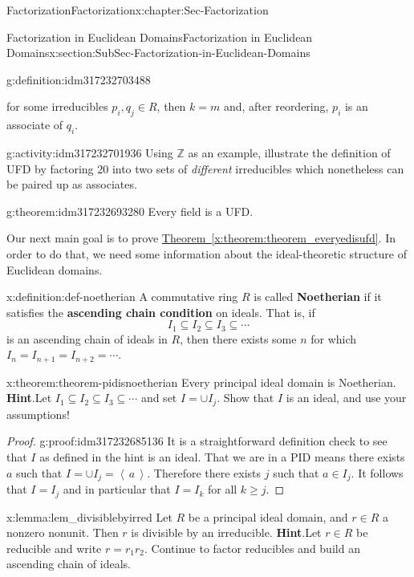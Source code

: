 \documentclass[oneside,10pt,]{book}
\newcommand{\blocktitlefont}{\relax}
\newcommand{\xreffont}{\relax}
\newcommand{\terminology}[1]{\textbf{#1}}
\numberwithin{equation}{section}
\renewcommand{\geq}{\geqslant}
\newcommand{\ideal}[1]{\left\langle\, #1 \,\right\rangle}
\def\Z{{\mathbb Z}}
\begin{document}
\begin{chapterptx}{Factorization}{}{Factorization}{}{}{x:chapter:Sec-Factorization}
\begin{sectionptx}{Factorization in Euclidean Domains}{}{Factorization in Euclidean Domains}{}{}{x:section:SubSec-Factorization-in-Euclidean-Domains}
\begin{definition}{}{g:definition:idm317232703488}
\begin{enumerate}
\begin{equation*}
\end{equation*}
for some irreducibles \(p_i, q_j\in R\), then \(k=m\) and, after reordering, \(p_i\) is an associate of \(q_i\).%
\end{enumerate}
%
\end{definition}
\begin{activity}{}{g:activity:idm317232701936}%
Using \(\Z\) as an example, illustrate the definition of UFD by factoring 20 into two sets of \emph{different} irreducibles which nonetheless can be paired up as associates.%
\end{activity}
\begin{theorem}{}{}{g:theorem:idm317232693280}%
Every field is a UFD.%
\end{theorem}
Our next main goal is to prove \hyperref[x:theorem:theorem_everyedisufd]{Theorem~{\xreffont\ref{x:theorem:theorem_everyedisufd}}}. In order to do that, we need some information about the ideal-theoretic structure of Euclidean domains.%
\begin{definition}{}{x:definition:def-noetherian}%
A commutative ring \(R\) is called \terminology{Noetherian} if it satisfies the \terminology{ascending chain condition} on ideals. That is, if%
\begin{equation*}
I_1 \subseteq I_2\subseteq I_3\subseteq \cdots
\end{equation*}
is an ascending chain of ideals in \(R\), then there exists some \(n\) for which \(I_n = I_{n+1} = I_{n+2} = \cdots\).%
\end{definition}
\begin{theorem}{}{}{x:theorem:theorem-pidisnoetherian}%
Every principal ideal domain is Noetherian.%
\textbf{\blocktitlefont Hint}.\quad{}Let \(I_1\subseteq I_2\subseteq I_3 \subseteq \cdots\) and set \(I = \cup I_j\). Show that \(I\) is an ideal, and use your assumptions!%
\end{theorem}
\begin{proof}{}{g:proof:idm317232685136}
It is a straightforward definition check to see that \(I\) as defined in the hint is an ideal. That we are in a PID means there exists \(a\) such that \(I=\cup I_j=\ideal{a}\). Therefore there exists \(j\) such that \(a\in I_j\). It follows that \(I=I_j\) and in particular that \(I=I_k\) for all \(k\geq j\).%
\end{proof}
\begin{lemma}{}{}{x:lemma:lem_divisiblebyirred}%
Let \(R\) be a principal ideal domain, and \(r\in R\) a nonzero nonunit. Then \(r\) is divisible by an irreducible.%
\textbf{\blocktitlefont Hint}.\quad{}Let \(r\in R\) be reducible and write \(r = r_1 r_2\). Continue to factor reducibles and build an ascending chain of ideals.%

\end{lemma}
\end{sectionptx}
\end{chapterptx}
\end{document}
